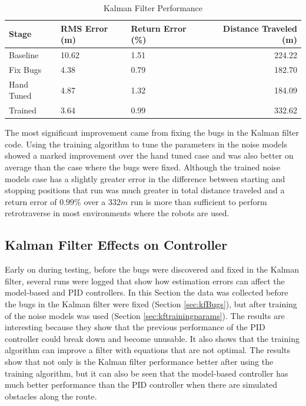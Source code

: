 \begin{table}[ht!]
\caption{Kalman Filter Performance}
\small
\centering
\begin{tabular}{@{}lllr@{}} \toprule
Stage      & RMS Error (m)  & Return Error (\%) & Distance Traveled (m) \\ \midrule
Baseline   & 10.62          & 1.51              & 224.22 \\
Fix Bugs   & 4.38           & 0.79              & 182.70 \\
Hand Tuned & 4.87           & 1.32              & 184.09 \\
Trained    & 3.64           & 0.99              & 332.62 \\ \bottomrule
\end{tabular}
\label{tab:resultsKF}
\end{table}

The most significant improvement came from fixing the bugs in the Kalman filter code. Using the training algorithm to tune the parameters in the noise models showed a marked improvement over the hand tuned case and was also better on average than the case where the bugs were fixed. Although the trained noise models case has a slightly greater error in the difference between starting and stopping positions that run was much greater in total distance traveled and a return error of $0.99\%$ over a $332m$ run is more than sufficient to perform retrotraverse in most environments where the robots are used.

\subsection{Kalman Filter Effects on Controller}
Early on during testing, before the bugs were discovered and fixed in the Kalman filter, several runs were logged that show how estimation errors can affect the model-based and PID controllers. In this Section the data was collected before the bugs in the Kalman filter were fixed (Section \ref{sec:kfBugs}), but after training of the noise models was used (Section \ref{sec:kftrainingparams}). The results are interesting because they show that the previous performance of the PID controller could break down and become unusable. It also shows that the training algorithm can improve a filter with equations that are not optimal. The results show that not only is the Kalman filter performance better after using the training algorithm, but it can also be seen that the model-based controller has much better performance than the PID controller when there are simulated obstacles along the route.

